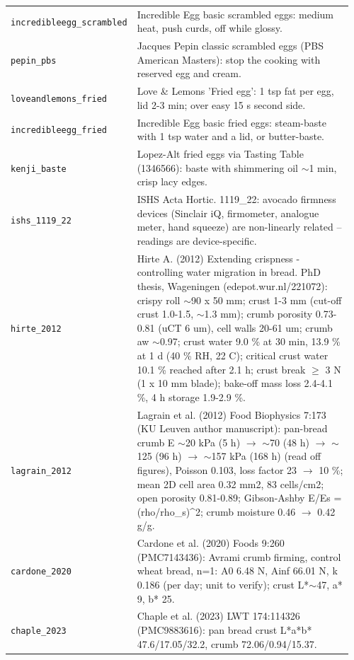 \documentclass[10.5pt,a4paper]{article}
\begin{document}
{\begin{longtable}{@{}p{0.16\linewidth}p{0.8\linewidth}@{}}
\texttt{incredibleegg\_\allowbreak{}scrambled} & Incredible Egg basic scrambled eggs: medium heat, push curds, off while glossy. \\
\texttt{pepin\_\allowbreak{}pbs} & Jacques Pepin classic scrambled eggs (PBS American Masters): stop the cooking with reserved egg and cream. \\
\texttt{loveandlemons\_\allowbreak{}fried} & Love \& Lemons 'Fried egg': 1 tsp fat per egg, lid 2-3 min; over easy 15 s second side. \\
\texttt{incredibleegg\_\allowbreak{}fried} & Incredible Egg basic fried eggs: steam-baste with 1 tsp water and a lid, or butter-baste. \\
\texttt{kenji\_\allowbreak{}baste} & Lopez-Alt fried eggs via Tasting Table (1346566): baste with shimmering oil $\sim$1 min, crisp lacy edges. \\
\texttt{ishs\_\allowbreak{}1119\_\allowbreak{}22} & ISHS Acta Hortic. 1119\_22: avocado firmness devices (Sinclair iQ, firmometer, analogue meter, hand squeeze) are non-linearly related -- readings are device-specific. \\
\texttt{hirte\_\allowbreak{}2012} & Hirte A. (2012) Extending crispness - controlling water migration in bread. PhD thesis, Wageningen (edepot.wur.nl/221072): crispy roll $\sim$90 x 50 mm; crust 1-3 mm (cut-off crust 1.0-1.5, $\sim$1.3 mm); crumb porosity 0.73-0.81 (uCT 6 um), cell walls 20-61 um; crumb aw $\sim$0.97; crust water 9.0 \% at 30 min, 13.9 \% at 1 d (40 \% RH, 22 C); critical crust water 10.1 \% reached after 2.1 h; crust break $\ge$ 3 N (1 x 10 mm blade); bake-off mass loss 2.4-4.1 \%, 4 h storage 1.9-2.9 \%. \\
\texttt{lagrain\_\allowbreak{}2012} & Lagrain et al. (2012) Food Biophysics 7:173 (KU Leuven author manuscript): pan-bread crumb E $\sim$20 kPa (5 h) $\to$ $\sim$70 (48 h) $\to$ $\sim$125 (96 h) $\to$ $\sim$157 kPa (168 h) (read off figures), Poisson 0.103, loss factor 23 $\to$ 10 \%; mean 2D cell area 0.32 mm2, 83 cells/cm2; open porosity 0.81-0.89; Gibson-Ashby E/Es = (rho/rho\_s)\^{}2; crumb moisture 0.46 $\to$ 0.42 g/g. \\
\texttt{cardone\_\allowbreak{}2020} & Cardone et al. (2020) Foods 9:260 (PMC7143436): Avrami crumb firming, control wheat bread, n=1: A0 6.48 N, Ainf 66.01 N, k 0.186 (per day; unit to verify); crust L*$\sim$47, a* 9, b* 25. \\
\texttt{chaple\_\allowbreak{}2023} & Chaple et al. (2023) LWT 174:114326 (PMC9883616): pan bread crust L*a*b* 47.6/17.05/32.2, crumb 72.06/0.94/15.37. \\

\end{longtable}}
\end{document}
